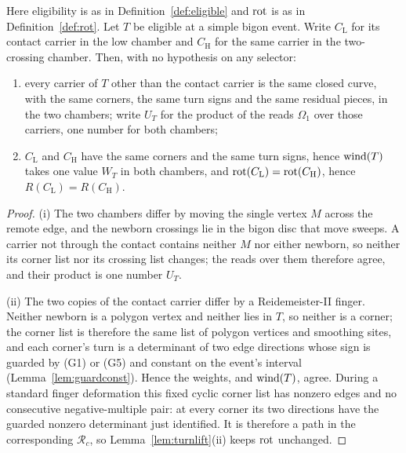 \begin{lemma}\label{lem:chambercommon}
Here eligibility is as in Definition~\ref{def:eligible} and $\operatorname{rot}$ is as in
Definition~\ref{def:rot}.
Let $T$ be eligible at a simple bigon event. Write $C_{\mathrm L}$ for its
contact carrier in the low chamber and $C_{\mathrm H}$ for the same carrier in
the two-crossing chamber. Then, with no hypothesis on any selector:
\begin{enumerate}
\item[(i)] every carrier of $T$ other than the contact carrier is the same
closed curve, with the same corners, the same turn signs and the same residual
pieces, in the two chambers; write $U_T$ for the product of the reads
$\Omega_1$ over those carriers, one number for both chambers;
\item[(ii)] $C_{\mathrm L}$ and $C_{\mathrm H}$ have the same corners and the
same turn signs, hence $\operatorname{wind}(T)$ takes one value $W_T$ in both chambers, and
$\operatorname{rot}(C_{\mathrm L})=\operatorname{rot}(C_{\mathrm H})$, hence
$R(C_{\mathrm L})=R(C_{\mathrm H})$.
\end{enumerate}
\end{lemma}
\begin{proof}
(i) The two chambers differ by moving the single vertex $M$ across the remote
edge, and the newborn crossings lie in the bigon disc that move sweeps. A
carrier not through the contact contains neither $M$ nor either newborn, so
neither its corner list nor its crossing list changes; the reads over them
therefore agree, and their product is one number $U_T$.

(ii) The two copies of the contact carrier differ by a Reidemeister-II finger.
Neither newborn is a polygon vertex and neither lies in $T$, so neither is a
corner; the corner list is therefore the same list of polygon vertices and
smoothing sites, and each corner's turn is a determinant of two edge directions
whose sign is guarded by (G1) or (G5) and constant on the event's interval
(Lemma~\ref{lem:guardconst}). Hence the weights, and $\operatorname{wind}(T)$, agree. During a standard finger
deformation this fixed cyclic corner list has nonzero edges and no consecutive
negative-multiple pair: at every corner its two directions have the guarded
nonzero determinant just identified. It is therefore a path in the corresponding
$\mathcal R_c$, so Lemma~\ref{lem:turnlift}(ii) keeps $\operatorname{rot}$ unchanged.
\end{proof}

